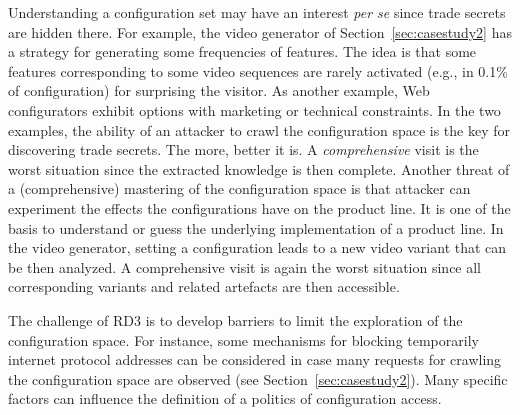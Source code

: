  Understanding a configuration set may have an interest \emph{per se} since trade secrets are hidden there. 
For example, the video generator of Section~\ref{sec:casestudy2} has a strategy for generating some frequencies of features. The idea is that some features corresponding to some video sequences are rarely activated (e.g., in 0.1\% of configuration) for surprising the visitor. 
As another example, Web configurators exhibit options with marketing or technical constraints. 
In the two examples, the ability of an attacker to crawl the configuration space is the key for discovering trade secrets. The more, better it is. A \emph{comprehensive} visit is the worst situation since the extracted knowledge is then complete. %
 Another threat of a (comprehensive) mastering of the configuration space is that attacker can experiment the effects the configurations have on the product line. 
It is one of the basis to understand or guess the underlying implementation of a product line.
 In the video generator, setting a configuration leads to a new video variant that can be then analyzed. 
A comprehensive visit is again the worst situation since all corresponding variants and related artefacts are then accessible.


The challenge of RD3 is to develop barriers to limit the exploration of the configuration space. 
For instance, some mechanisms for blocking temporarily internet protocol addresses can be considered in case many requests for crawling the configuration space are observed (see Section~\ref{sec:casestudy2}). Many specific factors can influence the definition of a politics of configuration access. %






